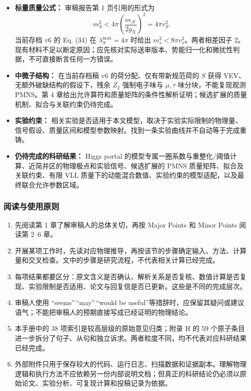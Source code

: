 \documentclass[
  chinese,
  UTF8]{ctexart}
\providecommand{\tightlist}{%
  \setlength{\itemsep}{0pt}\setlength{\parskip}{0pt}}
\begin{document}
\begin{itemize}
\tightlist
\item
  \textbf{标量质量公式：} 审稿报告第 1 页引用的形式为
  \[m_S^2<4\pi\left(\frac{m_{A'}}{2g_X}\right)^2=4\pi v_S^2.\] 当前存档
  v6 的 Eq. (34) 在 \(\lambda_S^{\max}=4\pi\) 时给出
  \(m_s^2<8\pi v_s^2\)。两者相差因子
  2。现有材料不足以断定原因；应先核对实际送审版本、势能归一化和微扰性判据，不可直接断言任何一方错误。
\item
  \textbf{中微子结构：} 在当前存档稿 v6 的荷分配、仅有带新规范荷的 \(S\)
  获得 VEV、无额外破缺结构的假设下，残余 \(Z_2\) 强制电子味与
  \(\mu,\tau\) 味分块，不能复现观测 PMNS。第 4
  章给出允许算符和质量矩阵的条件性解析证明；候选扩展的质量机制、拟合与关联约束仍待完成。
\item
  \textbf{实验约束：}
  相关实验是否适用于本文模型，取决于实验实际限制的物理量、信号假设、质量区间和模型参数映射。找到一条实验曲线并不自动等于完成重铸。
\item
  \textbf{仍待完成的科研结果：} Higgs portal
  的模型专属一圈系数与重整化/阈值计算、近简并区的物理极点和实验信号、候选扩展的
  PMNS 质量矩阵、拟合及关联约束、有限 VLL
  质量下的动能混合数值、实验约束的模型适配，以及最终联合允许参数区域。
\end{itemize}

\subsubsection{阅读与使用原则}\label{ux9605ux8bfbux4e0eux4f7fux7528ux539fux5219}

\begin{enumerate}
\def\labelenumi{\arabic{enumi}.}
\tightlist
\item
  先阅读第 1 章了解审稿人的总体关切，再按 Major Points 和 Minor Points
  阅读第 2--6 章。
\item
  开展某项工作时，先读对应物理推导，再按该节的步骤确定输入、方法、计算量和交叉检查。文中的步骤是研究流程，不代表相关计算已经完成。
\item
  每项结果都要区分：原文含义是否确认、解析关系是否复核、数值计算是否复现、实验限制是否适用、论文与回复信是否已更新。这些是不同的完成层次。
\item
  审稿人使用 ``seems''\,``may''\,``would be
  useful''等措辞时，应保留其疑问或建议语气；不能把审稿人的预期直接写成已经证明的物理结论。
\item
  本手册中的 38 项索引是较高层级的原始意见归类；附录 H 的 59
  个原子条目进一步拆分了句子、从句和独立诉求。两者粒度不同，均不代表对应科研结果已经完成。
\item
  外部附件只用于保存较大的代码、运行日志、扫描数据和证据副本。理解物理逻辑和执行方法不应依赖另一份内部说明文档；但真正的科研结论仍必须以原始论文、实验分析、可复现计算和投稿记录为依据。
\end{enumerate}
\end{document}
